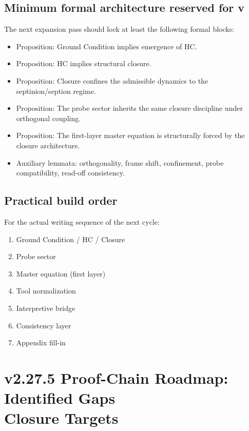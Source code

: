 \subsection*{Minimum formal architecture reserved for v\docversion}
The next expansion pass should lock at least the following formal blocks:
\begin{itemize}[leftmargin=2em]
  \item Proposition: Ground Condition implies emergence of HC.
  \item Proposition: HC implies structural closure.
  \item Proposition: Closure confines the admissible dynamics to the septinion/seption regime.
  \item Proposition: The probe sector inherits the same closure discipline under orthogonal coupling.
  \item Proposition: The first-layer master equation is structurally forced by the closure architecture.
  \item Auxiliary lemmata: orthogonality, frame shift, confinement, probe compatibility, read-off consistency.
\end{itemize}

\subsection*{Practical build order}
For the actual writing sequence of the next cycle:
\begin{enumerate}[leftmargin=2em]
  \item Ground Condition / HC / Closure
  \item Probe sector
  \item Master equation (first layer)
  \item Tool normalization
  \item Interpretive bridge
  \item Consistency layer
  \item Appendix fill-in
\end{enumerate}



\clearpage
\section*{v2.27.5 Proof-Chain Roadmap: Identified Gaps\\Closure Targets}
\label{sec:v2275-roadmap}

